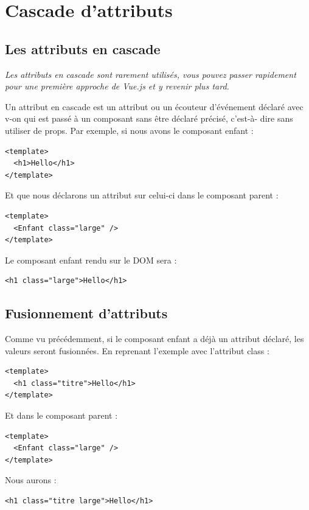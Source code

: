 

\section{Cascade d'attributs}
\subsection{Les attributs en cascade}
{\em Les attributs en cascade sont rarement utilisés, vous pouvez passer rapidement pour une première approche de {\color{monOrange}Vue.js} et y revenir plus tard.}

Un attribut en cascade est un attribut ou un écouteur d'événement déclaré avec {\color{monOrange}v-on} qui est passé à un composant sans être déclaré précisé, c'est-à- dire sans utiliser de {\color{monOrange}props}. Par exemple, si nous avons le composant enfant :
\begin{verbatim}
<template>
  <h1>Hello</h1>
</template>
\end{verbatim}
Et que nous déclarons un attribut sur celui-ci dans le composant parent :
\begin{verbatim}
<template>
  <Enfant class="large" />
</template>
\end{verbatim}
Le composant enfant rendu sur le DOM sera :
\begin{verbatim}
<h1 class="large">Hello</h1>
\end{verbatim}
\subsection{Fusionnement d'attributs}
Comme vu précédemment, si le composant enfant a déjà un attribut déclaré, les valeurs seront fusionnées. En reprenant l'exemple avec l'attribut {\color{monOrange}class} :
\begin{verbatim}
<template>
  <h1 class="titre">Hello</h1>
</template>
\end{verbatim}
Et dans le composant parent :
\begin{verbatim}
<template>
  <Enfant class="large" />
</template>
\end{verbatim}
Nous aurons :
\begin{verbatim}
<h1 class="titre large">Hello</h1>
\end{verbatim}

